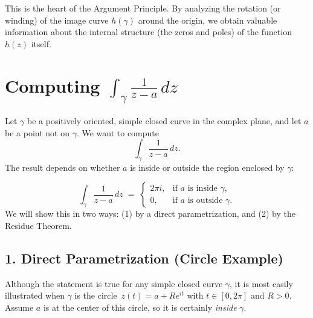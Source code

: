 \documentclass[12pt]{article}
\theoremstyle{definition} %
\theoremstyle{plain} %
\begin{document}
\begin{enumerate}
          This is the heart of the Argument Principle. By analyzing the rotation (or winding) of the image curve \( h(\gamma) \) around the origin, we obtain valuable information about the internal structure (the zeros and poles) of the function \( h(z) \) itself.

\end{enumerate}

\section*{Computing \(\displaystyle \int_{\gamma} \frac{1}{z - a}\,dz\)}

Let \(\gamma\) be a positively oriented, simple closed curve in the complex plane, and let \(a\) be a point not on \(\gamma\). We want to compute
\[
  \int_{\gamma} \frac{1}{z - a}\,dz.
\]
The result depends on whether \(a\) is inside or outside the region enclosed by \(\gamma\):

\[
  \int_{\gamma} \frac{1}{z - a}\,dz 
  \;=\;
  \begin{cases}
      2\pi i, & \text{if $a$ is inside $\gamma$,}\\
      0,      & \text{if $a$ is outside $\gamma$.}
  \end{cases}
\]
We will show this in two ways: (1) by a direct parametrization, and (2) by the Residue Theorem.

\subsection*{1.\; Direct Parametrization (Circle Example)}

Although the statement is true for any simple closed curve \(\gamma\), it is most easily illustrated when \(\gamma\) is the circle 
\(\,z(t) = a + Re^{it}\) with \(t \in [0,2\pi]\) and \(R>0\).  Assume \(a\) is at the center of this circle, so it is certainly \emph{inside} \(\gamma\).
\end{document}
